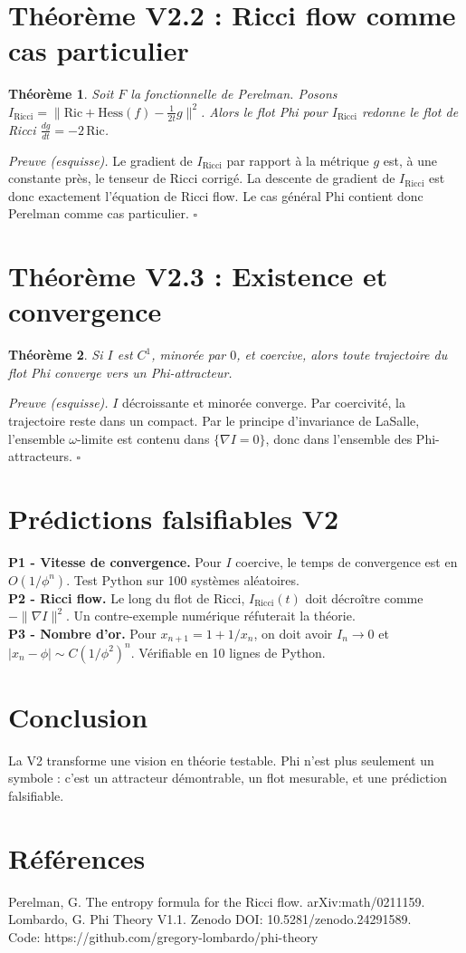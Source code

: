 \documentclass[11pt,a4paper]{article}
\newtheorem{theorem}{Théorème}[section]
\begin{document}
\section{Théorème V2.2 : Ricci flow comme cas particulier}
\begin{theorem}
Soit $F$ la fonctionnelle de Perelman. Posons $I_{\text{Ricci}} = \| \text{Ric} + \text{Hess}(f) - \frac{1}{2t}g\|^2$. Alors le flot Phi pour $I_{\text{Ricci}}$ redonne le flot de Ricci $\frac{dg}{dt} = -2\,\text{Ric}$.
\end{theorem}
\textit{Preuve (esquisse).} Le gradient de $I_{\text{Ricci}}$ par rapport à la métrique $g$ est, à une constante près, le tenseur de Ricci corrigé. La descente de gradient de $I_{\text{Ricci}}$ est donc exactement l'équation de Ricci flow. Le cas général Phi contient donc Perelman comme cas particulier. $\square$

\section{Théorème V2.3 : Existence et convergence}
\begin{theorem}
Si $I$ est $C^1$, minorée par $0$, et coercive, alors toute trajectoire du flot Phi converge vers un Phi-attracteur.
\end{theorem}
\textit{Preuve (esquisse).} $I$ décroissante et minorée converge. Par coercivité, la trajectoire reste dans un compact. Par le principe d'invariance de LaSalle, l'ensemble $\omega$-limite est contenu dans $\{ \nabla I = 0\}$, donc dans l'ensemble des Phi-attracteurs. $\square$

\section{Prédictions falsifiables V2}
\textbf{P1 - Vitesse de convergence.} Pour $I$ coercive, le temps de convergence est en $O(1/\phi^n)$. Test Python sur 100 systèmes aléatoires.\\
\textbf{P2 - Ricci flow.} Le long du flot de Ricci, $I_{\text{Ricci}}(t)$ doit décroître comme $-\|\nabla I\|^2$. Un contre-exemple numérique réfuterait la théorie.\\
\textbf{P3 - Nombre d'or.} Pour $x_{n+1}=1+1/x_n$, on doit avoir $I_n\to 0$ et $|x_n-\phi|\sim C(1/\phi^2)^n$. Vérifiable en 10 lignes de Python.

\section{Conclusion}
La V2 transforme une vision en théorie testable. Phi n'est plus seulement un symbole : c'est un attracteur démontrable, un flot mesurable, et une prédiction falsifiable.

\section*{Références}
Perelman, G. The entropy formula for the Ricci flow. arXiv:math/0211159.\\
Lombardo, G. Phi Theory V1.1. Zenodo DOI: 10.5281/zenodo.24291589.\\
Code: https://github.com/gregory-lombardo/phi-theory
\end{document}
